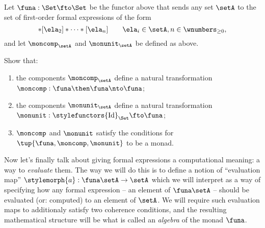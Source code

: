 \begin{gradedexercise}
    \label{ex:ListMonad}
    Let $\funa : \Set \fto \Set$ be the functor above that sends any set $\setA$ to the set of first-order formal expressions of the form
    \begin{equation*}
    [\ela_1]
        * [\ela_2] * \cdots * [\ela_n] \quad \quad \ela_i \in \setA, n \in \wnumbers_{\geq 0},
    \end{equation*}
    and let $\moncomp_\setA$ and $\monunit_\setA$ be defined as above.
    
    Show that:
    \begin{enumerate}
        \item the components $\moncomp_\setA$ define a natural transformation $\moncomp : \funa \then \funa \nto \funa$;
        \item the components $\monunit_\setA$ define a natural transformation $\monunit : \stylefunctors{\text{Id}}_{\Set} \fto \funa$;
        \item $\moncomp$ and $\monunit$ satisfy the conditions for $\tup{\funa, \moncomp, \monunit}$ to be a monad.
    \end{enumerate}
\end{gradedexercise}




Now let's finally talk about giving formal expressions a computational meaning: a way to \emph{evaluate} them.
The way we will do this is to define a notion of ``evaluation map'' $\stylemorph{a}: \funa \setA \to \setA$ which we will interpret as a way of specifying how any formal expression -- an element of $\funa \setA$ -- should be evaluated (or: computed) to an element of $\setA$.
We will require such evaluation maps to additionaly satisfy two coherence conditions, and the resulting mathematical structure will be what is called an \emph{algebra} of the monad $\funa$.



